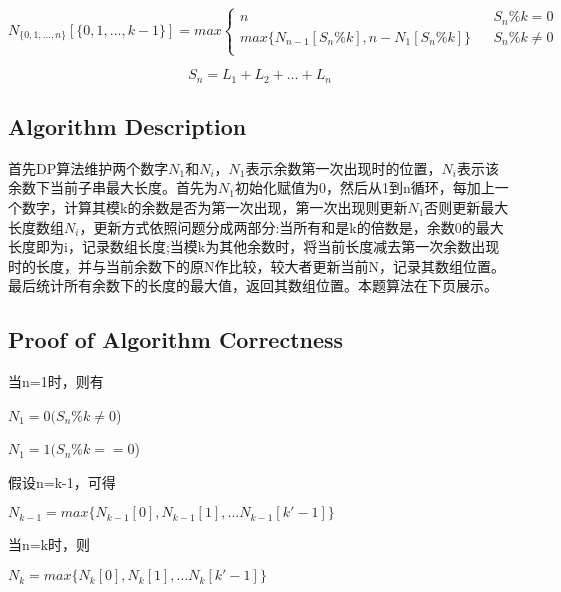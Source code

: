 \documentclass{article}
\begin{document}
\begin{equation} 
N_{\{0,1,...,n\}}[\{0,1,...,k-1\}]=max\left\{
\begin{array}{lcr}
n      &      &  S_n\%k=0\\
max\{N_{n-1}[S_n\%k], n-N_1[S_n\%k]\}    &      & S_n\%k\neq0\\

\end{array} \right.
\end{equation} 

\begin{equation} 
S_n = L_1+ L_2+...+L_n
\end{equation} 

\subsection{Algorithm Description}

首先DP算法维护两个数字$N_1$和$N_i$，$N_1$表示余数第一次出现时的位置，$N_i$表示该余数下当前子串最大长度。首先为$N_1$初始化赋值为0，然后从1到n循环，每加上一个数字，计算其模k的余数是否为第一次出现，第一次出现则更新$N_1$否则更新最大长度数组$N_i$，更新方式依照问题分成两部分:当所有和是k的倍数是，余数0的最大长度即为i，记录数组长度;当模k为其他余数时，将当前长度减去第一次余数出现时的长度，并与当前余数下的原N作比较，较大者更新当前N，记录其数组位置。最后统计所有余数下的长度的最大值，返回其数组位置。本题算法在下页展示。



\subsection{Proof of Algorithm Correctness}
当n=1时，则有
\\

\begin{center} 
$N_1=0 (S_n\%k \neq0$)

$N_1=1 (S_n\%k ==0$)
\end{center} 

假设n=k-1，可得

\begin{center} 
$N_{k-1}=max\{N_{k-1}[0], N_{k-1}[1],...N_{k-1}[k'-1]\}$
\end{center} 

当n=k时，则

\begin{center} 
$N_{k}=max\{N_{k}[0], N_{k}[1],...N_{k}[k'-1]\}$
\end{center} 
\end{document}
